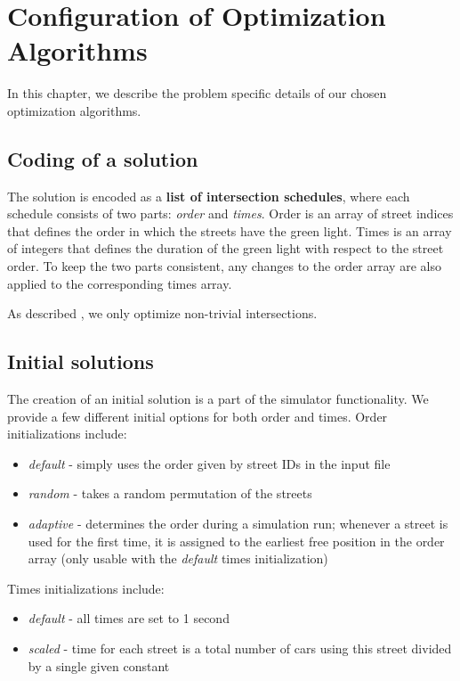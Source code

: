 \chapter{Configuration of Optimization Algorithms}

In this chapter, we describe the problem specific details of our chosen optimization algorithms.

\section{Coding of a solution}

The solution is encoded as a \textbf{list of intersection schedules}, where each schedule consists of two parts: \textit{order} and \textit{times}. Order is an array of street indices that defines the order in which the streets have the green light. Times is an array of integers that defines the duration of the green light with respect to the street order. To keep the two parts consistent, any changes to the order array are also applied to the corresponding times array.

As described , we only optimize non-trivial intersections.

\section{Initial solutions}

The creation of an initial solution is a part of the simulator functionality. We provide a few different initial options for both order and times. Order initializations include:
\begin{itemize}
    \item \textit{default} - simply uses the order given by street IDs in the input file
    \item \textit{random} - takes a random permutation of the streets
    \item \textit{adaptive} - determines the order during a simulation run; whenever a street is used for the first time, it is assigned to the earliest free position in the order array (only usable with the \textit{default} times initialization)
\end{itemize}
Times initializations include:
\begin{itemize}
    \item \textit{default} - all times are set to 1 second
    \item \textit{scaled} - time for each street is a total number of cars using this street divided by a single given constant
\end{itemize}


